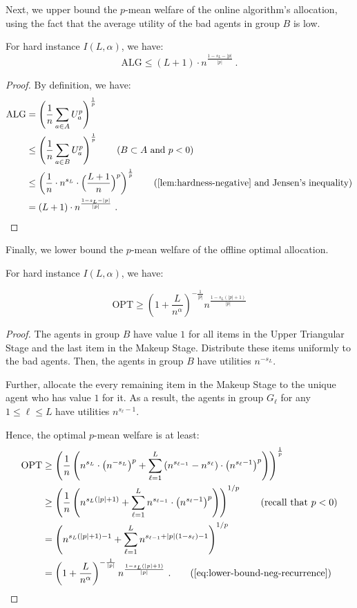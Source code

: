 \documentclass[11pt,letterpaper]{article}
\newcommand{\OPT}{\mathrm{OPT}}
\newcommand{\ALG}{\mathrm{ALG}}
\newcommand{\utility}{U}
\begin{document}
Next, we upper bound the $p$-mean welfare of the online algorithm's allocation, using the fact that the average utility of the bad agents in group $B$ is low.

\begin{lemma}
	\label{lem:hardness-negative-algorithm}
	For hard instance $I(L, \alpha)$, we have:
	\[
		\ALG \le (L+1) \cdot n^{\frac{1-s_L-|p|}{|p|}}
		~.
	\]	
\end{lemma}

\begin{proof}
	By definition, we have:
	\begin{align*}
		\ALG & = \left( \frac{1}{n} \sum_{a \in A} \utility_a^p \right)^{\frac{1}{p}}\\
	    & \leq \left( \frac{1}{n} \sum_{a \in B} \utility_a^p \right)^{\frac{1}{p}} \tag{$B \subset A$ and $p < 0$} \\
	    & \le \left( \frac{1}{n} \cdot n^{s_L} \cdot \Big(\frac{L+1}{n}\Big)^p \right)^{\frac{1}{p}} \tag{\Cref{lem:hardness-negative} and Jensen's inequality} \\
		& = (L+1) \cdot n^{\frac{1-s_L-|p|}{|p|}}~.
	\end{align*}
\end{proof}



Finally, we lower bound the $p$-mean welfare of the offline optimal allocation.

\begin{lemma}
	\label{lem:hardness-negative-optimal}
	For  hard instance $I(L, \alpha)$, we have:
	
	\[
		\OPT \ge \left(1+\frac{L}{n^{\alpha}} \right)^{-\frac{1}{|p|}} n^{\frac{1-s_L(|p|+1)}{|p|}}
	\]	
\end{lemma}

\begin{proof}
The agents in group $B$ have value $1$ for all items in the Upper Triangular Stage and the last item in the Makeup Stage.
Distribute these items uniformly to the bad agents.
Then, the agents in group $B$ have utilities $n^{-s_L}$.

Further, allocate the every remaining item in the Makeup Stage to the unique agent who has value $1$ for it.
As a result, the agents in group $G_\ell$ for any $1 \le \ell \le L$ have utilities $n^{s_\ell-1}$. 

Hence, the optimal $p$-mean welfare is at least:
\begin{align*}
	\OPT & \geq \left(\frac{1}{n}\left( n^{s_L}\cdot \left( n^{-s_L}\right)^{p} +\sum_{\ell=1}^L \left( n^{s_{\ell-1}} -n^{s_\ell}\right)\cdot \left( n^{s_\ell -1}\right)^{p}\right)\right)^{\frac{1}{p}}\\
	& \geq \left(\frac{1}{n}\left( n^{s_L(|p|+1)} +\sum_{\ell=1}^L n^{s_{\ell-1}}\cdot \left( n^{s_\ell -1}\right)^{p}\right)\right)^{1/p} \tag{recall that $p < 0$} \\
	& =\left( n^{s_L(|p|+1) -1} +\sum_{\ell=1}^L n^{s_{\ell-1} +|p|( 1-s_\ell) -1}\right)^{1/p}\\
	& = \left(1+\frac{L}{n^{\alpha}} \right)^{-\frac{1}{|p|}} n^{\frac{1-s_L(|p|+1)}{|p|}}
	~.
	\tag{\Cref{eq:lower-bound-neg-recurrence}}
\end{align*}
\end{proof}
\end{document}
